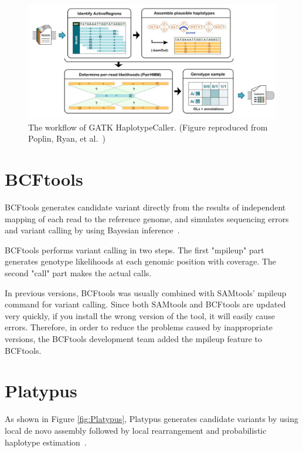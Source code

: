 \documentclass[PhD]{PHlab-thesis}
\begin{document}
\begin{figure}[h!]
	\centering
	\includegraphics[scale=0.25]{figures/GATK HaplotypeCaller.png}
	\caption{The workflow of GATK HaplotypeCaller. (Figure reproduced from Poplin, Ryan, et al.~\cite{Poplin2018GH})}
	\label{fig:GATK HaplotypeCaller} %
\end{figure}

\section{BCFtools}
BCFtools generates candidate variant directly from the results of independent mapping of each read to the reference genome, and simulates sequencing errors and variant calling by using Bayesian inference~\cite{Li2011SAMtools, Li2010SAMtools}.

BCFtools performs variant calling in two steps. The first "mpileup" part generates genotype likelihoods at each genomic position with coverage. The second "call" part makes the actual calls.

In previous versions, BCFtools was usually combined with SAMtools' mpileup command for variant calling. Since both SAMtools and BCFtools are updated very quickly, if you install the wrong version of the tool, it will easily cause errors. Therefore, in order to reduce the problems caused by inappropriate versions, the BCFtools development team added the mpileup feature to BCFtools.

\section{Platypus}
As shown in Figure \ref{fig:Platypus}, Platypus generates candidate variants by using local de novo assembly followed by local rearrangement and probabilistic haplotype estimation~\cite{Rimmer2014Platypus}.
\end{document}
